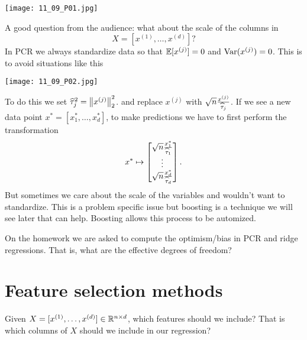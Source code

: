 \begin{center}
    \texttt{[image: 11\_09\_P01.jpg]}
\end{center}

\begin{remark}
    A good question from the audience: what about the scale of the columns in 
    \[X = [x^{(1)},\ldots, x^{(d)}]?\] 
    In  PCR we always standardize data so that ${\mathbb{E}}[x^{(j)}]=0$ and $\operatorname{Var}(x^{(j)})=0$. This is to avoid situations like this 

    \begin{center}
        \texttt{[image: 11\_09\_P02.jpg]}   
    \end{center}

    To do this we set $\widehat{\tau}_j^2 = \left\|x^{(j)}\right\|_2^2$. and replace $x^{(j)}$ with $\sqrt{n} \frac{x^{(j)}}{\widehat{\tau}_j}$. If we see a new data point $x^*=[x_1^*,\ldots, x_d^*]$, to make predictions we have to first perform the transformation
    \[x^* \mapsto \begin{bmatrix}
        \sqrt{n} \frac{x_1^*}{\widehat{\tau}_1}\\ \vdots \\ \sqrt{n} \frac{x_d^*}{\widehat{\tau}_d}
    \end{bmatrix}.\]
    But sometimes we care about the scale of the variables and wouldn't want to standardize. This is a problem specific issue but boosting is a technique we will see later that can help. Boosting allows this process to be automized.
\end{remark}
\begin{remark}
    On the homework we are asked to compute the optimism/bias in PCR and ridge regressions. That is, what are the effective degrees of freedom?
\end{remark}
\section{Feature selection methods}
Given $X = [x^{(1)},\ldots, x^{(d)}] \in {\mathbb R}^{n \times d}$, which features should we include? That is which columns of $X$ should we include in our regression?

